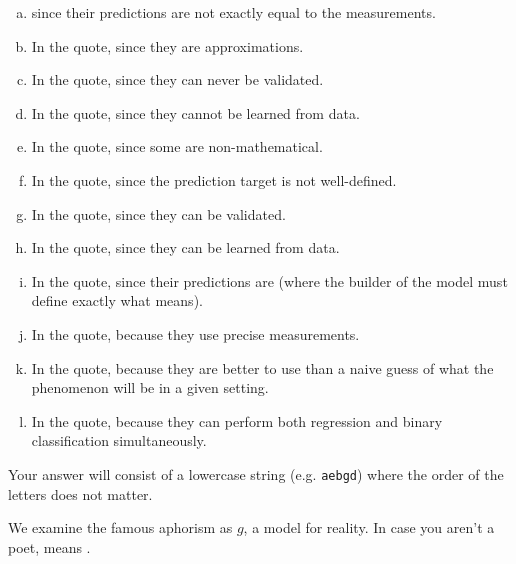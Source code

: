 \documentclass[12pt,landscape]{article}
\newcommand{\instr}{\small Your answer will consist of a lowercase string (e.g. \texttt{aebgd}) where the order of the letters does not matter. \normalsize}
\begin{document}
\begin{enumerate}[(a)]
\item {} since their predictions are not exactly equal to the measurements.
\item In the quote,  since they are approximations.
\item In the quote,  since they can never be validated.
\item In the quote,  since they cannot be learned from data.
\item In the quote,  since some are non-mathematical.
\item In the quote,  since the prediction target is not well-defined.
\item In the quote,  since they can be validated.
\item In the quote,  since they can be learned from data.
\item In the quote,  since their predictions are  (where the builder of the model must define exactly what  means).
\item In the quote,  because they use precise measurements.
\item In the quote,  because they are better to use than a naive guess of what the phenomenon will be in a given setting.
\item In the quote,  because they can perform both regression and binary classification simultaneously.
\end{enumerate}
\eenum\instr\pagebreak


\problem{} We examine the famous aphorism  as $g$, a model for reality. In case you aren't a poet,  means .


\vspace{-0.2cm}\benum{} 
\end{document}
